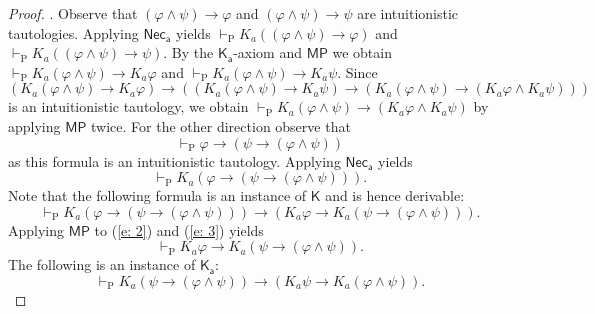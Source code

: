 \documentclass{myifcolog}
\newcommand{\K}{K}
\newcommand{\agi}{a}
\newcommand{\hickp}{\mathrm{P}}
\numberwithin{theorem}{section}
\begin{document}
\begin{proof}
    . Observe that $(\varphi \wedge \psi) \rightarrow \varphi$ and $(\varphi \wedge \psi) \rightarrow \psi$ are intuitionistic tautologies. Applying $\mathsf{Nec_\agi}$ yields $\vdash_\hickp \K_\agi ((\varphi \wedge \psi) \rightarrow \varphi)$ and $\vdash_\hickp \K_\agi ((\varphi \wedge \psi) \rightarrow \psi)$. By the $\mathsf{K_\agi}$-axiom and $\mathsf{MP}$ we obtain $\vdash_\hickp \K_\agi(\varphi \wedge \psi) \rightarrow \K_\agi \varphi$ and $\vdash_\hickp \K_\agi(\varphi \wedge \psi) \rightarrow \K_\agi \psi$. Since 
    \begin{equation*}
     (\K_\agi(\varphi \wedge \psi) \rightarrow \K_\agi \varphi) \rightarrow ((\K_\agi(\varphi \wedge \psi) \rightarrow \K_\agi \psi) \rightarrow (\K_\agi(\varphi \wedge \psi) \rightarrow (\K_\agi \varphi \wedge \K_\agi \psi)))
    \end{equation*}
    is an intuitionistic tautology, we obtain $\vdash_\hickp \K_\agi(\varphi \wedge \psi) \rightarrow (\K_\agi \varphi \wedge \K_\agi \psi)$ by applying $\mathsf{MP}$ twice. For the other direction observe that
    \begin{equation}\label{e: 1}
        \vdash_\hickp \varphi \rightarrow (\psi \rightarrow (\varphi \wedge \psi))
    \end{equation}
    as this formula is an intuitionistic tautology. Applying $\mathsf{Nec_\agi}$ yields
    \begin{equation}\label{e: 2}
        \vdash_\hickp \K_\agi (\varphi \rightarrow (\psi \rightarrow (\varphi \wedge \psi))).
    \end{equation}
    Note that the following formula is an instance of $\mathsf{K}$ and is hence derivable:
    \begin{equation}\label{e: 3}
        \vdash_\hickp \K_\agi (\varphi \rightarrow (\psi \rightarrow (\varphi \wedge \psi))) \rightarrow (\K_\agi \varphi \rightarrow \K_\agi (\psi \rightarrow (\varphi \wedge \psi))).
    \end{equation}
    Applying $\mathsf{MP}$ to (\ref{e: 2}) and (\ref{e: 3}) yields
    \begin{equation}\label{e: 4}
        \vdash_\hickp \K_\agi \varphi \rightarrow \K_\agi (\psi \rightarrow (\varphi \wedge \psi)).
    \end{equation}
    The following is an instance of $\mathsf{K_\agi}$:
    \begin{equation}\label{e: 5}
        \vdash_\hickp \K_\agi (\psi \rightarrow (\varphi \wedge \psi)) \rightarrow (\K_\agi \psi \rightarrow \K_\agi (\varphi \wedge \psi)).

\end{equation}
\end{proof}
\end{document}
